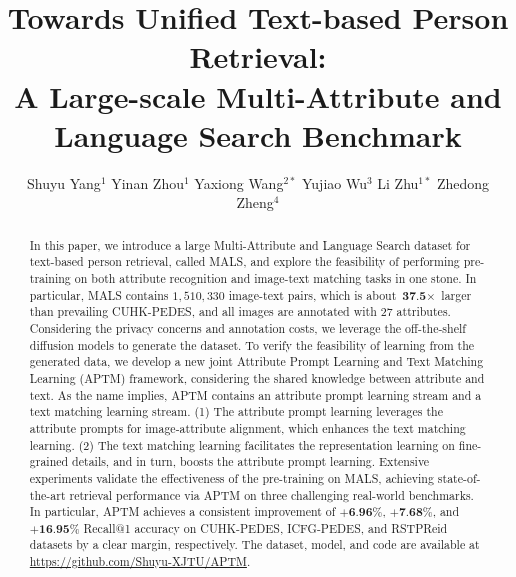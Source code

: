\documentclass[sigconf]{acmart}
\begin{document}
\title{ Towards Unified Text-based Person Retrieval: \\ 
A Large-scale Multi-Attribute and Language Search Benchmark}


\author{  
Shuyu Yang$^1$ \quad Yinan Zhou$^1$ \quad Yaxiong Wang$^{2*}$ \quad Yujiao Wu$^3$ \quad Li Zhu$^{1*}$ \quad Zhedong Zheng$^4$}

\renewcommand{\shortauthors}{Shuyu Yang et al.}

\renewcommand{\thefootnote}{\fnsymbol{footnote}}
\begin{abstract}
In this paper, we introduce a large Multi-Attribute and Language Search dataset for text-based person retrieval, called MALS, and explore the feasibility of performing pre-training on both attribute recognition and image-text matching tasks in one stone. 
In particular, MALS contains $1,510,330$ image-text pairs, which is about $\textbf{37.5}\times$ larger than prevailing CUHK-PEDES, and all images are annotated with 27 attributes. 
Considering the privacy concerns and annotation costs, we leverage the off-the-shelf diffusion models to generate the dataset.
To verify the feasibility of learning from the generated data, we develop a new joint Attribute Prompt Learning and Text Matching Learning (APTM) framework, considering the shared knowledge between attribute and text.
As the name implies, APTM contains an attribute prompt learning stream and a text matching learning stream. 
(1) The attribute prompt learning leverages the attribute prompts for image-attribute alignment, which enhances the text matching learning.
(2) The text matching learning facilitates the representation learning on fine-grained details, and in turn, boosts the attribute prompt learning.
Extensive experiments validate the effectiveness of the pre-training on MALS, achieving state-of-the-art retrieval performance via APTM on three challenging real-world benchmarks. 
In particular, APTM achieves a consistent improvement of $\textbf{+6.96}\%$, $\textbf{+7.68}\%$, and $\textbf{+16.95}\%$ Recall@1 accuracy on CUHK-PEDES, ICFG-PEDES, and RSTPReid datasets by a clear margin, respectively. 
The dataset, model, and code are available at \url{https://github.com/Shuyu-XJTU/APTM}. 
\end{abstract} 
\end{document}
